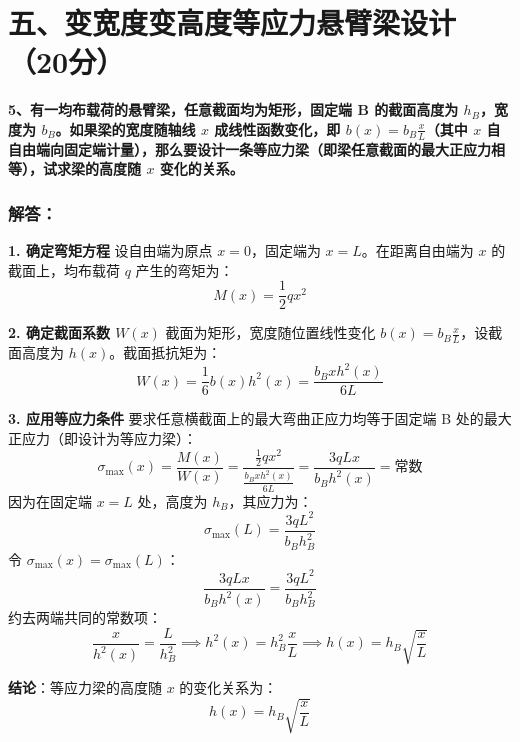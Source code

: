 \documentclass[UTF8,fontset=windows]{ctexart}
\begin{document}
\newpage

\section*{五、变宽度变高度等应力悬臂梁设计（20分）}

\textbf{5、有一均布载荷的悬臂梁，任意截面均为矩形，固定端 B 的截面高度为 $h_B$，宽度为 $b_B$。如果梁的宽度随轴线 $x$ 成线性函数变化，即 $b(x) = b_B \frac{x}{L}$（其中 $x$ 自自由端向固定端计量），那么要设计一条等应力梁（即梁任意截面的最大正应力相等），试求梁的高度随 $x$ 变化的关系。}

\subsubsection*{解答：}

\textbf{1. 确定弯矩方程}
设自由端为原点 $x = 0$，固定端为 $x = L$。在距离自由端为 $x$ 的截面上，均布载荷 $q$ 产生的弯矩为：
\[
    M(x) = \frac{1}{2} q x^2
\]

\textbf{2. 确定截面系数 $W(x)$}
截面为矩形，宽度随位置线性变化 $b(x) = b_B \frac{x}{L}$，设截面高度为 $h(x)$。截面抵抗矩为：
\[
    W(x) = \frac{1}{6} b(x) h^2(x) = \frac{b_B x h^2(x)}{6 L}
\]

\textbf{3. 应用等应力条件}
要求任意横截面上的最大弯曲正应力均等于固定端 B 处的最大正应力（即设计为等应力梁）：
\[
    \sigma_{\max}(x) = \frac{M(x)}{W(x)} = \frac{\frac{1}{2} q x^2}{\frac{b_B x h^2(x)}{6 L}} = \frac{3 q L x}{b_B h^2(x)} = \text{常数}
\]
因为在固定端 $x = L$ 处，高度为 $h_B$，其应力为：
\[
    \sigma_{\max}(L) = \frac{3 q L^2}{b_B h_B^2}
\]
令 $\sigma_{\max}(x) = \sigma_{\max}(L)$：
\[
    \frac{3 q L x}{b_B h^2(x)} = \frac{3 q L^2}{b_B h_B^2}
\]
约去两端共同的常数项：
\[
    \frac{x}{h^2(x)} = \frac{L}{h_B^2} \implies h^2(x) = h_B^2 \frac{x}{L} \implies h(x) = h_B \sqrt{\frac{x}{L}}
\]

\textbf{结论}：等应力梁的高度随 $x$ 的变化关系为：
\[
    h(x) = h_B \sqrt{\frac{x}{L}}
\]
\end{document}
